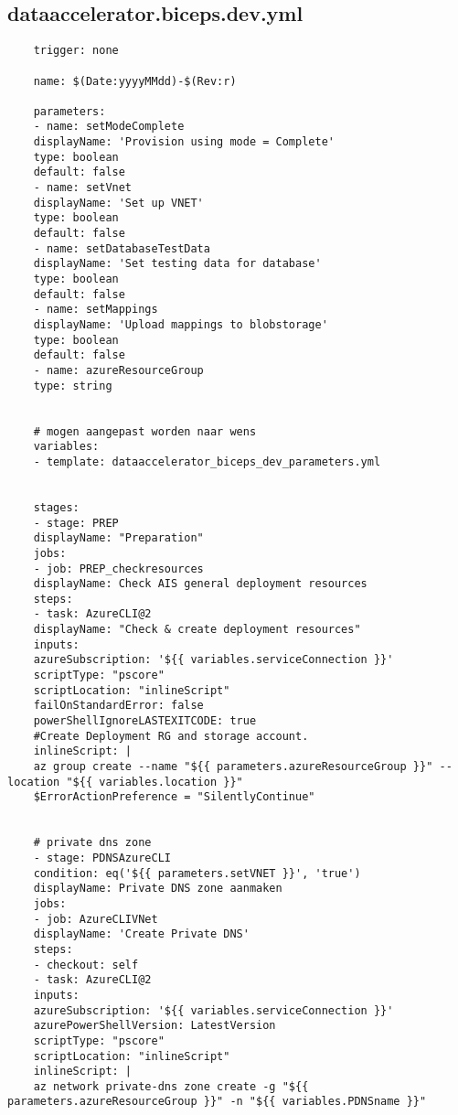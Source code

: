 \documentclass[dutch,dit,thesis]{hogentreport}
\begin{document}
\subsection{dataaccelerator.biceps.dev.yml}
\label{sec:dataaccelerator.biceps.dev.yml}
\begin{lstlisting}
    trigger: none

    name: $(Date:yyyyMMdd)-$(Rev:r)

    parameters:
    - name: setModeComplete
    displayName: 'Provision using mode = Complete'
    type: boolean
    default: false
    - name: setVnet
    displayName: 'Set up VNET'
    type: boolean
    default: false
    - name: setDatabaseTestData
    displayName: 'Set testing data for database'
    type: boolean
    default: false
    - name: setMappings
    displayName: 'Upload mappings to blobstorage'
    type: boolean
    default: false
    - name: azureResourceGroup
    type: string


    # mogen aangepast worden naar wens
    variables:
    - template: dataaccelerator_biceps_dev_parameters.yml


    stages:
    - stage: PREP
    displayName: "Preparation"
    jobs:
    - job: PREP_checkresources
    displayName: Check AIS general deployment resources
    steps:
    - task: AzureCLI@2
    displayName: "Check & create deployment resources"
    inputs:
    azureSubscription: '${{ variables.serviceConnection }}'
    scriptType: "pscore"
    scriptLocation: "inlineScript"
    failOnStandardError: false
    powerShellIgnoreLASTEXITCODE: true
    #Create Deployment RG and storage account.
    inlineScript: |
    az group create --name "${{ parameters.azureResourceGroup }}" --location "${{ variables.location }}"
    $ErrorActionPreference = "SilentlyContinue"


    # private dns zone
    - stage: PDNSAzureCLI
    condition: eq('${{ parameters.setVNET }}', 'true')
    displayName: Private DNS zone aanmaken
    jobs:
    - job: AzureCLIVNet
    displayName: 'Create Private DNS'
    steps:
    - checkout: self
    - task: AzureCLI@2
    inputs:
    azureSubscription: '${{ variables.serviceConnection }}'
    azurePowerShellVersion: LatestVersion
    scriptType: "pscore"
    scriptLocation: "inlineScript"
    inlineScript: |
    az network private-dns zone create -g "${{ parameters.azureResourceGroup }}" -n "${{ variables.PDNSname }}"


\end{lstlisting}
\end{document}
